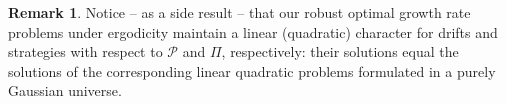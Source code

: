\documentclass{article}
\theoremstyle{plain}
\theoremstyle{definition}
\newtheorem{remark}[lem]{Remark}
\renewcommand{\P}{\mathbb{P}}
\newcommand{\Pcal}{{\mathcal P}}
\numberwithin{lem}{section}
\begin{document}
\begin{remark}
Notice -- as a side result -- that our robust optimal growth rate problems under ergodicity maintain a linear (quadratic) character for drifts and strategies with respect to $\mathcal{P}$ and $\Pi$, respectively: their solutions equal the solutions of the corresponding linear quadratic problems formulated in a purely Gaussian universe.
\end{remark}


\end{document}
